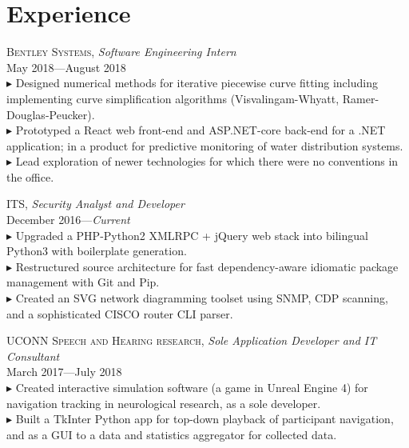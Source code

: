 \documentclass[Letterpaper,11pt]{article}
\newcommand{\bul}{$\blacktriangleright$ }
\begin{document}

\section*{Experience}

    \textsc{Bentley Systems},
    \textit{Software Engineering Intern}\\
    May 2018---August 2018\\
        \bul Designed numerical methods 
        for iterative piecewise curve fitting including implementing curve simplification algorithms
        (Visvalingam-Whyatt, Ramer-Douglas-Peucker).
        \\
        \bul Prototyped a React web front-end and ASP.NET-core back-end for a .NET application;
        in a product for predictive monitoring of water distribution systems. 
        \\
        \bul Lead exploration of newer technologies for which there were no conventions in the office.

    \textsc{ITS},
    \textit{Security Analyst and Developer}\\
    December 2016---\textit{Current}\\
        \bul Upgraded a PHP-Python2 XMLRPC + jQuery web stack into bilingual Python3 
        with boilerplate generation.
        \\
        \bul Restructured source architecture for fast dependency-aware idiomatic package management with Git and Pip.
        \\
        \bul Created an SVG network diagramming toolset using SNMP, CDP scanning, 
        and a sophisticated CISCO router CLI parser.

    \textsc{UCONN Speech and Hearing research},
    \textit{Sole Application Developer and IT Consultant}\\
    March 2017---July 2018\\
        \bul Created interactive simulation software (a game in Unreal Engine 4) 
        for navigation tracking in neurological research, as a sole developer.
        \\
        \bul Built a TkInter Python app for top-down playback of participant navigation,
        and as a GUI to a data and statistics aggregator for collected data.
        
\end{document}
